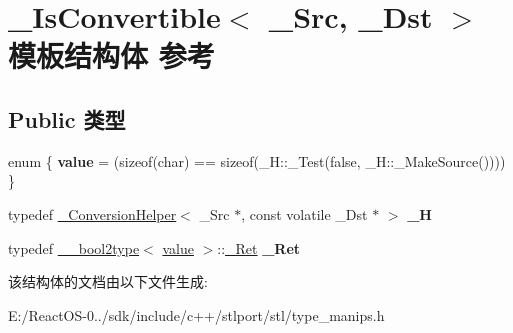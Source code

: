 \hypertarget{struct___is_convertible}{}\section{\+\_\+\+Is\+Convertible$<$ \+\_\+\+Src, \+\_\+\+Dst $>$ 模板结构体 参考}
\label{struct___is_convertible}
\subsection*{Public 类型}
\begin{DoxyCompactItemize}
\item 
\mbox{\label{struct___is_convertible_a2d2f6a09ec0fd393ca62d050c0bf7a83}} 
enum \{ {\bfseries value} = (sizeof(char) == sizeof(\+\_\+H\+:\+:\+\_\+\+Test(false, \+\_\+H\+:\+:\+\_\+\+Make\+Source())))
 \}
\item 
\mbox{\label{struct___is_convertible_af6f2328a88ac993853567af77bba605f}} 
typedef \hyperlink{struct___conversion_helper}{\+\_\+\+Conversion\+Helper}$<$ \+\_\+\+Src $\ast$, const volatile \+\_\+\+Dst $\ast$ $>$ {\bfseries \+\_\+H}
\item 
\mbox{\label{struct___is_convertible_a1f6b4f2cbfd04e0ced21dbd1beeed545}} 
typedef \hyperlink{struct____bool2type}{\+\_\+\+\_\+bool2type}$<$ \hyperlink{unionvalue}{value} $>$\+::\hyperlink{struct____true__type}{\+\_\+\+Ret} {\bfseries \+\_\+\+Ret}
\end{DoxyCompactItemize}


该结构体的文档由以下文件生成\+:\begin{DoxyCompactItemize}
\item 
E\+:/\+React\+O\+S-\/0../sdk/include/c++/stlport/stl/type\+\_\+manips.\+h\end{DoxyCompactItemize}
